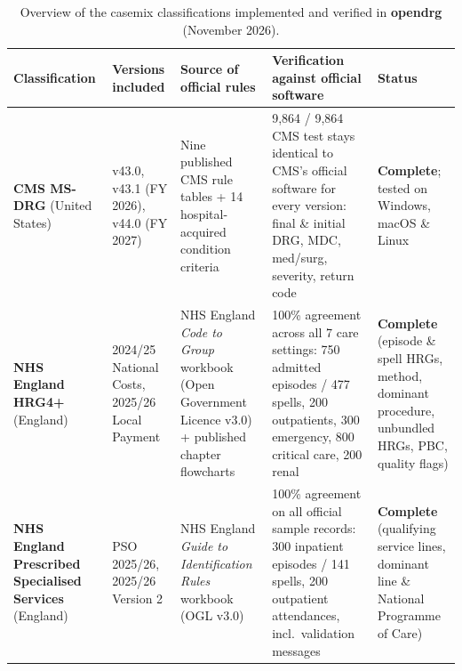 \documentclass[fleqn,10pt]{IOMEDArticle}
\begin{document}
\begin{table}[!t]\centering
\caption{Overview of the casemix classifications implemented and verified in \textbf{opendrg} (November 2026).}
\label{tab:headline}
\scriptsize
\setlength{\tabcolsep}{4.0pt}
\begin{tabular}{@{}p{2.2cm}p{2.5cm}p{3.6cm}p{4.8cm}p{3.0cm}@{}}
\toprule
Classification & Versions included & Source of official rules & Verification against official software & Status \\
\midrule
\textbf{CMS MS-DRG} (United States) & v43.0, v43.1 (FY 2026), v44.0 (FY 2027) & Nine published CMS rule tables + 14 hospital-acquired condition criteria & 9{,}864 / 9{,}864 CMS test stays identical to CMS's official software for every version: final \& initial DRG, MDC, med/surg, severity, return code & \textbf{Complete}; tested on Windows, macOS \& Linux \\
\textbf{NHS England HRG4+} (England) & 2024/25 National Costs, 2025/26 Local Payment & NHS England \emph{Code to Group} workbook (Open Government Licence v3.0) + published chapter flowcharts & 100\% agreement across all 7 care settings: 750 admitted episodes / 477 spells, 200 outpatients, 300 emergency, 800 critical care, 200 renal & \textbf{Complete} (episode \& spell HRGs, method, dominant procedure, unbundled HRGs, PBC, quality flags) \\
\textbf{NHS England Prescribed Specialised Services} (England) & PSO 2025/26, 2025/26 Version 2 & NHS England \emph{Guide to Identification Rules} workbook (OGL v3.0) & 100\% agreement on all official sample records: 300 inpatient episodes / 141 spells, 200 outpatient attendances, incl.\ validation messages & \textbf{Complete} (qualifying service lines, dominant line \& National Programme of Care) \\
\bottomrule
\end{tabular}
\end{table}
\end{document}
